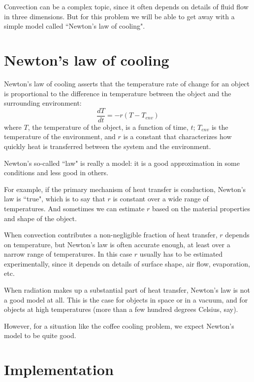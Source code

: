 \documentclass[12pt]{book}
\theoremstyle{exercise}
\begin{document}
Convection can be a complex topic, since it often depends on details of fluid flow in three dimensions.  But for this problem we will be able to get away with a simple model called ``Newton's law of cooling".


\section{Newton's law of cooling}

Newton's law of cooling asserts that the temperature rate of change for an object is proportional to the difference in temperature between the object and the surrounding environment:
%
\[ \frac{dT}{dt} = -r (T - T_{env}) \]
%
where $T$, the temperature of the object, is a function of time, $t$; $T_{env}$ is the temperature of the environment, and $r$ is a constant that characterizes how quickly heat is transferred between the system and the environment.

Newton's so-called ``law" is really a model: it is a good approximation in some conditions and less good in others.

For example, if the primary mechanism of heat transfer is conduction, Newton's law is ``true", which is to say that $r$ is constant over a wide range of temperatures.  And sometimes we can estimate $r$ based on the material properties and shape of the object.

When convection contributes a non-negligible fraction of heat transfer, $r$ depends on temperature, but Newton's law is often accurate enough, at least over a narrow range of temperatures.  In this case $r$ usually has to be estimated experimentally, since it depends on details of surface shape, air flow, evaporation, etc.

When radiation makes up a substantial part of heat transfer, Newton's law is not a good model at all.  This is the case for objects in space or in a vacuum, and for objects at high temperatures (more than a few hundred degrees Celsius, say).


However, for a situation like the coffee cooling problem, we expect Newton's model to be quite good.


\section{Implementation}
\label{coffee_impl}
\end{document}
